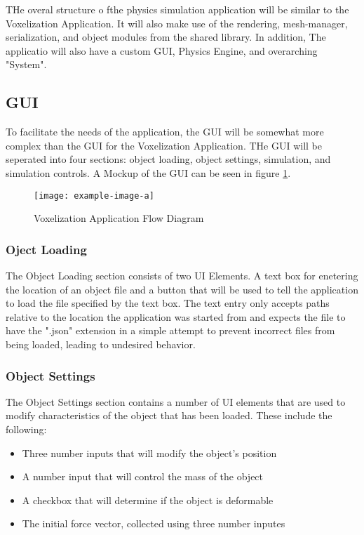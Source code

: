 THe overal structure o fthe physics simulation application will be similar to the Voxelization Application. It will 
also make use of the rendering, mesh-manager, serialization, and object modules from the shared library. In addition,
The applicatio will also have a custom GUI, Physics Engine, and overarching "System".

\subsection{GUI}

To facilitate the needs of the application, the GUI will be somewhat more complex than the GUI for the Voxelization 
Application. THe GUI will be seperated into four sections: object loading, object settings, simulation, and simulation
controls. A Mockup of the GUI can be seen in figure \ref{fig:PhysicsSimulationGUIMockup}.

\begin{figure}[h]
  \centering
  \texttt{[image: example-image-a]}
  \caption{Voxelization Application Flow Diagram}
  \label{fig:PhysicsSimulationGUIMockup}
\end{figure}

\subsubsection{Oject Loading}

The Object Loading section consists of two UI Elements. A text box for enetering the location of an object file and 
a button that will be used to tell the application to load the file specified by the text box. The text entry only
accepts paths relative to the location the application was started from and expects the file to have the ".json" 
extension in a simple attempt to prevent incorrect files from being loaded, leading to undesired behavior.

\subsubsection{Object Settings}

The Object Settings section contains a number of UI elements that are used to modify characteristics of the object 
that has been loaded. These include the following: 

\begin{itemize}
  \item Three number inputs that will modify the object's position
  \item A number input that will control the mass of the object
  \item A checkbox that will determine if the object is deformable
  \item The initial force vector, collected using three number inputes
\end{itemize}

